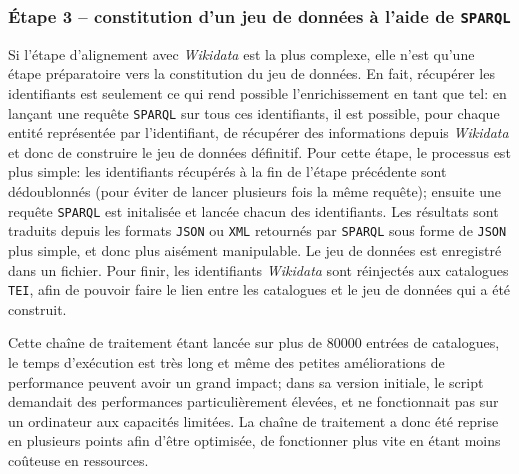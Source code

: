 \documentclass[a4paper, 12pt, twoside]{book}
\newcommand{\json}{\texttt{JSON}}
\newcommand{\sparql}{\texttt{\gls{SPARQL}}}
\newcommand{\tei}{\texttt{TEI}}
\newcommand{\xml}{\texttt{XML}}
\newcommand{\wkd}{\textit{Wikidata}}
\begin{document}
\subsubsection{Étape 3 -- constitution d'un jeu de données à l'aide de \sparql{}}
Si l'étape d'alignement avec \wkd{} est la plus complexe, elle n'est qu'une étape préparatoire vers la constitution du jeu de données. En fait, récupérer les identifiants est seulement ce qui rend possible l'enrichissement en tant que tel: en lançant une requête \sparql{} sur tous ces identifiants, il est possible, pour chaque entité représentée par l'identifiant, de récupérer des informations depuis \wkd{} et donc de construire le jeu de données définitif. Pour cette étape, le processus est plus simple: les identifiants récupérés à la fin de l'étape précédente sont dédoublonnés (pour éviter de lancer plusieurs fois la même requête); ensuite une requête \sparql{} est initalisée et lancée chacun des identifiants. Les résultats sont traduits depuis les formats \json{} ou \xml{} retournés par \sparql{} sous forme de \json{} plus simple, et donc plus aisément manipulable. Le jeu de données est enregistré dans un fichier. Pour finir, les identifiants \wkd{} sont réinjectés aux catalogues \tei{}, afin de pouvoir faire le lien entre les catalogues et le jeu de données qui a été construit.

Cette chaîne de traitement étant lancée sur plus de 80000 entrées de catalogues, le temps d'exécution est très long et même des petites améliorations de performance peuvent avoir un grand impact; dans sa version initiale, le script demandait des performances particulièrement élevées, et ne fonctionnait pas sur un ordinateur aux capacités limitées. La chaîne de traitement a donc été reprise en plusieurs points afin d'être optimisée, de fonctionner plus vite en étant moins coûteuse en ressources.
\end{document}
